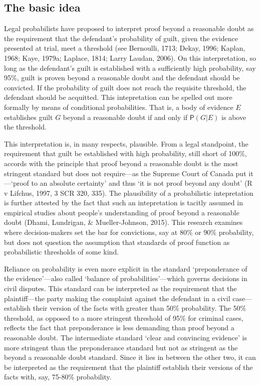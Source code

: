 \documentclass[
  10pt,
  dvipsnames,enabledeprecatedfontcommands]{scrartcl}
\newcommand{\pr}[1]{\mathsf{P}(#1)}
\begin{document}
\hypertarget{the-basic-idea}{%
\subsection{The basic idea}\label{the-basic-idea}}

Legal probabilists have proposed to interpret proof beyond a reasonable
doubt as the requirement that the defendant's probability of guilt,
given the evidence presented at trial, meet a threshold (see Bernoulli,
1713; Dekay, 1996; Kaplan, 1968; Kaye, 1979a; Laplace, 1814; Larry
Laudan, 2006). On this interpretation, so long as the defendant's guilt
is established with a sufficiently high probability, say 95\%, guilt is
proven beyond a reasonable doubt and the defendant should be convicted.
If the probability of guilt does not reach the requisite threshold, the
defendant should be acquitted. This intepretation can be spelled out
more formally by means of conditional probabilities. That is, a body of
evidence \(E\) establishes guilt \(G\) beyond a reasonable doubt if and
only if \(\pr{G\vert E}\) is above the threshold.

This interpretation is, in many respects, plausible. From a legal
standpoint, the requirement that guilt be established with high
probability, still short of 100\%, accords with the principle that proof
beyond a reasonable doubt is the most stringent standard but does not
require---as the Supreme Court of Canada put it---`proof to an absolute
certainty' and thus `it is not proof beyond any doubt' (R v Lifchus,
1997, 3 SCR 320, 335). The plausibility of a probabilistic intepretation
is further attested by the fact that such an intepretation is tacitly
assumed in empirical studies about people's understanding of proof
beyond a reasonable doubt (Dhami, Lundrigan, \& Mueller-Johnson, 2015).
This research examines where decision-makers set the bar for
convictions, say at 80\% or 90\% probability, but does not question the
assumption that standards of proof function as probabilistic thresholds
of some kind.

Reliance on probability is even more explicit in the standard
`preponderance of the evidence'---also called `balance of
probabilities'---which governs decisions in civil disputes. This
standard can be interpreted as the requirement that the plaintiff---the
party making the complaint against the defendant in a civil
case---establish their version of the facts with greater than 50\%
probability. The 50\% threshold, as opposed to a more stringent
threshold of 95\% for criminal cases, reflects the fact that
preponderance is less demanding than proof beyond a reasonable doubt.
The intermediate standard `clear and convincing evidence' is more
stringent than the preponderance standard but not as stringent as the
beyond a reasonable doubt standard. Since it lies in between the other
two, it can be interpreted as the requirement that the plaintiff
establish their versions of the facts with, say, 75-80\% probability.
\end{document}

